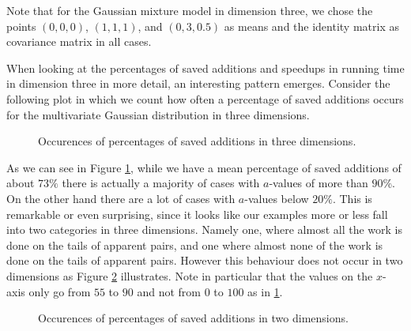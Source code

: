 Note that for the Gaussian mixture model in dimension three, we chose the points $(0,0,0)$, $(1,1,1)$, and $(0,3,0.5)$ as means and the identity matrix as covariance matrix in all cases. 

When looking at the percentages of saved additions and speedups in running time in dimension three in more detail, an interesting pattern emerges. Consider the following plot in which we count how often a percentage of saved additions occurs for the multivariate Gaussian distribution in three dimensions. 


\begin{figure}[H]
\begin{subfigure}[c]{0.95\textwidth}
\begin{center}

\end{center}
\end{subfigure}
\caption{Occurences of percentages of saved additions in three dimensions.}
\label{fig:saved_additions_3d}
\end{figure}

As we can see in Figure \ref{fig:saved_additions_3d}, while we have a mean percentage of saved additions of about $73\%$ there is actually a majority of cases with $a$-values of more than $90\%$. On the other hand there are a lot of cases with $a$-values below $20\%$. This is remarkable or even surprising, since it looks like our examples more or less fall into two categories in three dimensions. Namely one, where almost all the work is done on the tails of apparent pairs, and one where almost none of the work is done on the tails of apparent pairs. However this behaviour does not occur in two dimensions as Figure \ref{fig:saved_additions_2d} illustrates. Note in particular that the values on the $x$-axis only go from $55$ to $90$ and not from $0$ to $100$ as in \ref{fig:saved_additions_3d}.

\begin{figure}[H]
\begin{subfigure}[c]{0.95\textwidth}
\begin{center}

\end{center}
\end{subfigure}
\caption{Occurences of percentages of saved additions in two dimensions.}
\label{fig:saved_additions_2d}
\end{figure}

